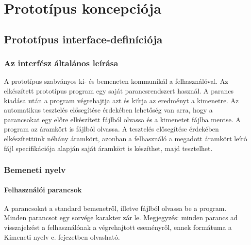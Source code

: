 %
\chapter{Prototípus koncepciója}

\parindent 0pt
\setcounter{secnumdepth}{3}
\setcounter{tocdepth}{3}
\thispagestyle{fancy}

\section{Prototípus interface-definíciója}

\subsection{Az interfész általános leírása}
A prototípus szabványos ki- és bemeneten kommunikál a felhasználóval. Az elkészített prototípus program egy
saját parancsrendszert használ. A parancs kiadása után a program végrehajtja azt és kiírja az eredményt a kimenetre. Az automatikus tesztelés elősegítése érdekében lehetőség van arra, hogy 
a parancsokat egy előre elkészített fájlból olvassa és a kimenetet fájlba mentse. A program az áramkört is
fájlból olvassa. A tesztelés elősegítése érdekében elkészítettünk néhány áramkört, azonban a felhasználó a megadott áramkört leíró fájl specifikációja alapján saját áramkört is készíthet, majd tesztelhet. 


\subsection{Bemeneti nyelv}

\subsubsection{Felhasználói parancsok}

A parancsokat a standard bemenetről, illetve fájlból olvassa be a program. Minden parancsot egy sorvége karakter zár le.\newline
Megjegyzés: minden parancs ad visszajelzést a felhasználónak a végrehajtott eseményről, ennek formátuma a Kimeneti nyelv c. fejezetben olvasható.\newline

